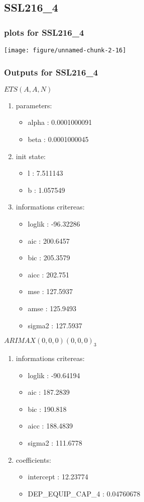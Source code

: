 \documentclass[10pt,a4paper]{article}\usepackage[]{graphicx}\usepackage[]{color}
\makeatletter
\def\maxwidth{ %
  \ifdim\Gin@nat@width>\linewidth
    \linewidth
  \else
    \Gin@nat@width
  \fi
}
\newcommand{\AaA}{\_}
\makeatother
\begin{document}
\newpage
\subsection{SSL216\AaA 4}
\subsubsection{plots for SSL216\AaA 4}

\texttt{[image: figure/unnamed-chunk-2-16]} 

\newpage
\subsubsection{Outputs for SSL216\AaA 4}
\begin{multicols}{2}


$ ETS(A,A,N) $
\begin{enumerate}
\item parameters:
\begin{itemize}
\item  alpha :  0.0001000091 
\item  beta :  0.0001000045 
\end{itemize}
\item init state:
\begin{itemize}
\item  l :  7.511143 
\item  b :  1.057549 
\end{itemize}
\item informations critereas:
\begin{itemize}
\item  loglik :  -96.32286 
\item  aic :  200.6457 
\item  bic :  205.3579 
\item  aicc :  202.751 
\item  mse :  127.5937 
\item  amse :  125.9493 
\item  sigma2 :  127.5937 
\end{itemize}
\end{enumerate}

\columnbreak


 $ARIMAX(0,0,0)(0,0,0)_{3}$ 
\begin{enumerate}
\item informations critereas:
\begin{itemize}
\item  loglik :  -90.64194 
\item  aic :  187.2839 
\item  bic :  190.818 
\item  aicc :  188.4839 
\item  sigma2 :  111.6778 
\end{itemize}

\item coefficients:
\begin{itemize}
\item  intercept :  12.23774 
\item  DEP\AaA EQUIP\AaA CAP\AaA 4 :  0.04760678 
\end{itemize}
\end{enumerate}
\end{multicols}
\end{document}
